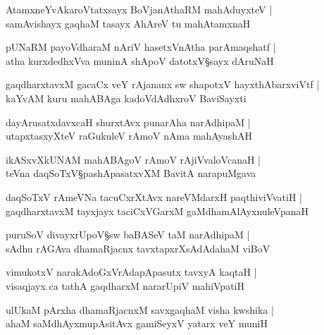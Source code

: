 \begin{shloka}
AtamxneYvAkaroVtatxsayx BoVjanAthaRM mahAduyxteV |\\
samAvishayx gaqhaM tasayx AhAreV tu mahAtamxnaH 
\end{shloka}

\begin{shloka}
pUNaRM payoVdharaM nAriV hasetxVnAtha parAmaqshatf |\\
atha kurxdedhxVva muninA shApoV datotxV\S sayx dAruNaH 
\end{shloka}

\begin{shloka}
gaqdharxtavxM gacaCx veY rAjananx sw shapotxV hayxthAbarxviVtf |\\
kaYvAM kuru mahABAga kadoVdAdhxroV BaviSayxti
\end{shloka}

\begin{shloka}
dayArusatxdavxcaH shurxtAvx punarAha narAdhipaM |\\
utapxtasxyXteV raGukuleV rAmoV nAma mahAyashAH 
\end{shloka}

\begin{shloka}
ikASxvXkUNAM mahABAgoV rAmoV rAjiVvaloVcanaH |\\
teVna daqSoTxV\S pashApasatxvXM BavitA narapuMgava
\end{shloka}

\begin{shloka}
daqSoTxV rAmeVNa tacuCxrXtAvx nareVMdarxH paqthiviVvatiH |\\
gaqdharxtavxM tayxjayx taciCxVGarxM gaMdhamAlAyxnuleVpanaH 
\end{shloka}

\begin{shloka}
puruSoV divayxrUpoV\S sw baBASeV taM narAdhipaM |\\
sAdhu rAGAva dhamaRjacnx tavxtapxrXsAdAdahaM viBoV 
\end{shloka}

\begin{shloka}
vimukotxV narakAdoGxVrAdapApasutx tavxyA kaqtaH |\\
visaqjayx ca tathA gaqdharxM nararUpiV mahiVpatiH 
\end{shloka}

\begin{shloka}
ulUkaM pArxha dhamaRjacnxM savxgaqhaM visha kwshika |\\
ahaM saMdhAyxmupAsitAvx gamiSeyxV yatarx veY muniH 
\end{shloka}

